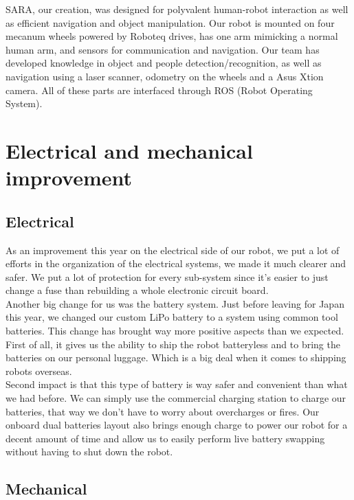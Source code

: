 \documentclass[runningheads,a4paper]{llncs}
\begin{document}
SARA, our creation, was designed for polyvalent human-robot interaction as well as efficient navigation and object manipulation. Our robot is mounted on four mecanum wheels powered by Roboteq drives, has one arm mimicking a normal human arm, and sensors for communication and navigation. Our team has developed knowledge in object and people detection/recognition, as well as navigation using a laser scanner, odometry on the wheels and a Asus Xtion camera. All of these parts are interfaced through ROS (Robot Operating System). \\

\section{Electrical and mechanical improvement}
\subsection{Electrical}

\tab As an improvement this year on the electrical side of our robot, we put a lot of efforts in the organization of the electrical systems, we made it much clearer and safer. We put a lot of protection for every sub-system since it’s easier to just change a fuse than rebuilding a whole electronic circuit board.\\

Another big change for us was the battery system. Just before leaving for Japan this year, we changed our custom LiPo battery to a system using common tool batteries. This change has brought way more positive aspects than we expected. First of all, it gives us the ability to ship the robot batteryless and to bring the batteries on our personal luggage. Which is a big deal when it comes to shipping robots overseas.\\

Second impact is that this type of battery is way safer and convenient than what we had before. We can simply use the commercial charging station to charge our batteries, that way we don’t have to worry about overcharges or fires. Our onboard dual batteries layout also brings enough charge to power our robot for a decent amount of time and allow us to easily perform live battery swapping without having to shut down the robot.\\



\subsection{Mechanical}
\end{document}
